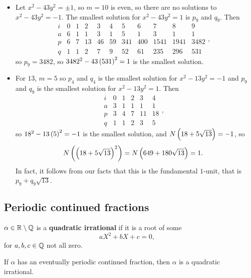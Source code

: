 \begin{example*}
\hfill
\begin{itemize}
\item Let $ x^2 - 43y^2 = \pm 1 $, so $ m = 10 $ is even, so there are no solutions to $ x^2 - 43y^2 = -1 $. The smallest solution for $ x^2 - 43y^2 = 1 $ is $ p_9 $ and $ q_9 $. Then
$$
\begin{array}{c|cccccccccc}
i & 0 & 1 & 2 & 3 & 4 & 5 & 6 & 7 & 8 & 9 \\
\hline
a & 6 & 1 & 1 & 3 & 1 & 5 & 1 & 3 & 1 & 1 \\
p & 6 & 7 & 13 & 46 & 59 & 341 & 400 & 1541 & 1941 & 3482 \\
q & 1 & 1 & 2 & 7 & 9 & 52 & 61 & 235 & 296 & 531
\end{array},
$$
so $ p_9 = 3482 $, so $ 3482^2 - 43\br{531}^2 = 1 $ is the smallest solution.
\item For $ 13 $, $ m = 5 $ so $ p_4 $ and $ q_4 $ is the smallest solution for $ x^2 - 13y^2 = -1 $ and $ p_9 $ and $ q_9 $ is the smallest solution for $ x^2 - 13y^2 = 1 $. Then
$$
\begin{array}{c|ccccc}
i & 0 & 1 & 2 & 3 & 4 \\
\hline
a & 3 & 1 & 1 & 1 & 1 \\
p & 3 & 4 & 7 & 11 & 18 \\
q & 1 & 1 & 2 & 3 & 5
\end{array},
$$
so $ 18^2 - 13\br{5}^2 = -1 $ is the smallest solution, and $ N\br{18 + 5\sqrt{13}} = -1 $, so
$$ N\br{\br{18 + 5\sqrt{13}}^2} = N\br{649 + 180\sqrt{13}} = 1. $$
In fact, it follows from our facts that this is the fundamental $ 1 $-unit, that is $ p_9 + q_9\sqrt{13} $.
\end{itemize}
\end{example*}

\pagebreak

\subsection{Periodic continued fractions}


\begin{definition}
$ \alpha \in \mathbb{R} \setminus \mathbb{Q} $ is a \textbf{quadratic irrational} if it is a root of some
$$ aX^2 + bX + c = 0, $$
for $ a, b, c \in \mathbb{Q} $ not all zero.
\end{definition}

\begin{proposition}
If $ \alpha $ has an eventually periodic continued fraction, then $ \alpha $ is a quadratic irrational.
\end{proposition}

